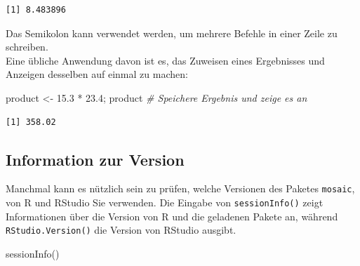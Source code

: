 \documentclass[
  ngerman,
]{scrbook}
\newenvironment{Shaded}{\begin{snugshade}}{\end{snugshade}}
\newcommand{\CommentTok}[1]{\textcolor[rgb]{0.56,0.35,0.01}{\textit{#1}}}
\newcommand{\FloatTok}[1]{\textcolor[rgb]{0.00,0.00,0.81}{#1}}
\newcommand{\FunctionTok}[1]{\textcolor[rgb]{0.00,0.00,0.00}{#1}}
\newcommand{\NormalTok}[1]{#1}
\newcommand{\OtherTok}[1]{\textcolor[rgb]{0.56,0.35,0.01}{#1}}
\newcommand{\SpecialCharTok}[1]{\textcolor[rgb]{0.00,0.00,0.00}{#1}}
\begin{document}
\begin{verbatim}
[1] 8.483896
\end{verbatim}

Das Semikolon kann verwendet werden, um mehrere Befehle in einer Zeile zu schreiben.\\
Eine übliche Anwendung davon ist es, das Zuweisen eines Ergebnisses und Anzeigen desselben auf einmal zu machen:

\begin{Shaded}
\begin{Highlighting}[]
\NormalTok{product }\OtherTok{\textless{}{-}} \FloatTok{15.3} \SpecialCharTok{*} \FloatTok{23.4}\NormalTok{; product    }\CommentTok{\# Speichere Ergebnis und zeige es an}
\end{Highlighting}
\end{Shaded}

\begin{verbatim}
[1] 358.02
\end{verbatim}

\hypertarget{information-zur-version}{%
\subsection{Information zur Version}\label{information-zur-version}}

Manchmal kann es nützlich sein zu prüfen, welche Versionen des Paketes \texttt{mosaic}, von \textsf{R} und
\textsf{RStudio} Sie verwenden. Die Eingabe von \texttt{sessionInfo()} zeigt Informationen über die Version von \textsf{R} und die geladenen Pakete an, während \texttt{RStudio.Version()} die Version von \textsf{RStudio} ausgibt.

\begin{Shaded}
\begin{Highlighting}[]
\FunctionTok{sessionInfo}\NormalTok{()}
\end{Highlighting}
\end{Shaded}
\end{document}
